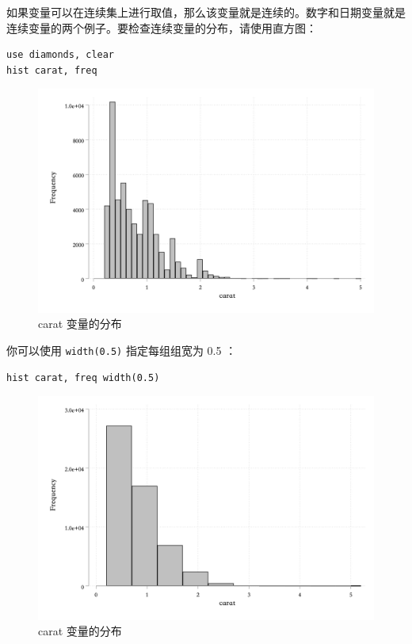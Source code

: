 如果变量可以在连续集上进行取值，那么该变量就是连续的。数字和日期变量就是连续变量的两个例子。要检查连续变量的分布，请使用直方图：

\begin{lstlisting}
use diamonds, clear
hist carat, freq
\end{lstlisting}

\begin{figure}[htbp]
  \centering
  \includegraphics[width=\textwidth]{assets/histcarat.png}
  \caption{carat 变量的分布}\label{fig:histcarat}
\end{figure}

你可以使用 \texttt{width(0.5)} 指定每组组宽为 0.5 ：

\begin{lstlisting}
hist carat, freq width(0.5)
\end{lstlisting}

\begin{figure}[htbp]
  \centering
  \includegraphics[width=\textwidth]{assets/histcarat2.png}
  \caption{carat 变量的分布}
  \label{fig:histcarat2}
\end{figure}

